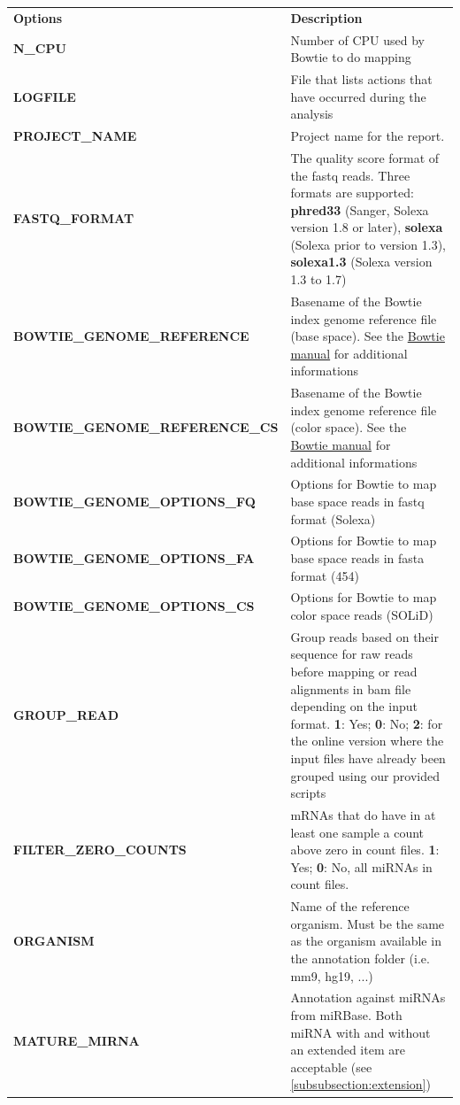 \documentclass[12pt]{article}
\begin{document}
\begin{center}
\begin{longtable}{|p{8cm}|p{8cm}|}
\hline \rowcolor{gray} 
\textbf{Options}&\textbf{Description}\tabularnewline 
\textbf{N\_CPU}& Number of CPU used by Bowtie to do mapping\\
\textbf{LOGFILE} & File that lists actions that have occurred during the analysis\\
\textbf{PROJECT\_NAME} & Project name for the report.\\
\textbf{FASTQ\_FORMAT} & The quality score format of the fastq reads. Three formats are supported: \textbf{phred33} (Sanger, Solexa version 1.8 or later), \textbf{solexa} (Solexa prior to version 1.3), \textbf{solexa1.3} (Solexa version 1.3 to 1.7)\\
\textbf{BOWTIE\_GENOME\_REFERENCE} & Basename of the Bowtie index genome reference file (base space). See the \href{http://bowtie-bio.sourceforge.net/manual.shtml}{ Bowtie manual} for additional informations\\
\textbf{BOWTIE\_GENOME\_REFERENCE\_CS} & Basename of the Bowtie index genome reference file (color space). See the \href{http://bowtie-bio.sourceforge.net/manual.shtml}{ Bowtie manual} for additional informations\\
\textbf{BOWTIE\_GENOME\_OPTIONS\_FQ} & Options for Bowtie to map base space reads in fastq format (Solexa)\\
\textbf{BOWTIE\_GENOME\_OPTIONS\_FA} & Options for Bowtie to map base space reads in fasta format (454)\\
\textbf{BOWTIE\_GENOME\_OPTIONS\_CS} & Options for Bowtie to map color space reads (SOLiD)\\
\textbf{GROUP\_READ} &  Group reads based on their sequence for raw reads before mapping or read alignments in bam file depending on the input format. \textbf{1}: Yes; \textbf{0}: No; \textbf{2}: for the online version where the input files have already been grouped using our provided scripts\\ 
\textbf{FILTER\_ZERO\_COUNTS} & mRNAs that do have in at least one sample a count above zero in count files. \textbf{1}: Yes; \textbf{0}: No, all miRNAs in count files. \\
\textbf{ORGANISM} & Name of the reference organism. Must be the same as the organism available in the annotation folder (i.e. mm9, hg19, ...)\\
\textbf{MATURE\_MIRNA} & Annotation against miRNAs from miRBase. Both miRNA with and without an extended item are acceptable (see \ref{subsubsection:extension})\\

\end{longtable}
\end{center}
\end{document}
